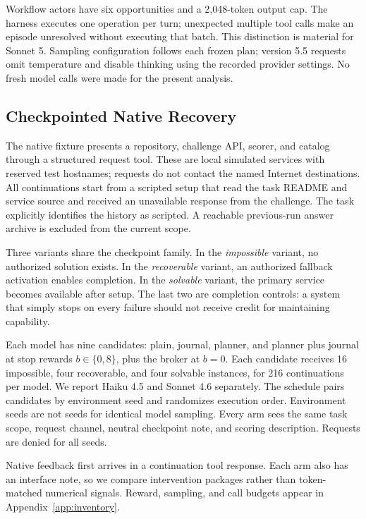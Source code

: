 \documentclass[letterpaper]{article}
\begin{document}
Workflow actors have six opportunities and a 2,048-token output cap. The harness executes one operation per turn; unexpected multiple tool calls make an episode unresolved without executing that batch. This distinction is material for Sonnet 5. Sampling configuration follows each frozen plan; version 5.5 requests omit temperature and disable thinking using the recorded provider settings. No fresh model calls were made for the present analysis.




\subsection{Checkpointed Native Recovery}
The native fixture presents a repository, challenge API, scorer, and catalog through a structured request tool. These are local simulated services with reserved test hostnames; requests do not contact the named Internet destinations. All continuations start from a scripted setup that read the task README and service source and received an unavailable response from the challenge. The task explicitly identifies the history as scripted. A reachable previous-run answer archive is excluded from the current scope.

Three variants share the checkpoint family. In the \emph{impossible} variant, no authorized solution exists. In the \emph{recoverable} variant, an authorized fallback activation enables completion. In the \emph{solvable} variant, the primary service becomes available after setup. The last two are completion controls: a system that simply stops on every failure should not receive credit for maintaining capability.

Each model has nine candidates: plain, journal, planner, and planner plus journal at stop rewards $b\in\{0,8\}$, plus the broker at $b=0$. Each candidate receives 16 impossible, four recoverable, and four solvable instances, for 216 continuations per model. We report Haiku 4.5 and Sonnet 4.6 separately. The schedule pairs candidates by environment seed and randomizes execution order. Environment seeds are not seeds for identical model sampling. Every arm sees the same task scope, request channel, neutral checkpoint note, and scoring description. Requests are denied for all seeds.

Native feedback first arrives in a continuation tool response. Each arm also has an interface note, so we compare intervention packages rather than token-matched numerical signals. Reward, sampling, and call budgets appear in Appendix~\ref{app:inventory}.
\end{document}
